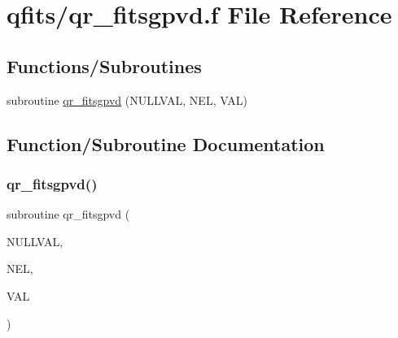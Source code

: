 \hypertarget{qr__fitsgpvd_8f}{}\section{qfits/qr\+\_\+fitsgpvd.f File Reference}
\label{qr__fitsgpvd_8f}
\subsection*{Functions/\+Subroutines}
\begin{DoxyCompactItemize}
\item 
subroutine \hyperlink{qr__fitsgpvd_8f_a2444ade6ec2ff88df3d54b352733365c}{qr\+\_\+fitsgpvd} (N\+U\+L\+L\+V\+AL, N\+EL, V\+AL)
\end{DoxyCompactItemize}


\subsection{Function/\+Subroutine Documentation}
\mbox{\label{qr__fitsgpvd_8f_a2444ade6ec2ff88df3d54b352733365c}} 
\subsubsection{\texorpdfstring{qr\+\_\+fitsgpvd()}{qr\_fitsgpvd()}}
{\footnotesize\ttfamily subroutine qr\+\_\+fitsgpvd (\begin{DoxyParamCaption}\item[{double precision}]{N\+U\+L\+L\+V\+AL,  }\item[{integer}]{N\+EL,  }\item[{double precision, dimension(nel)}]{V\+AL }\end{DoxyParamCaption})}

